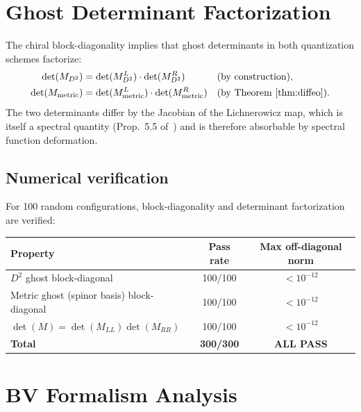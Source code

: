 \documentclass[11pt,a4paper]{article}
\begin{document}
\section{Ghost Determinant Factorization}
\label{sec:det}

The chiral block-diagonality implies that ghost determinants in
both quantization schemes factorize:
\begin{align}
  \det(M_{D^2}) &= \det(M_{D^2}^L) \cdot \det(M_{D^2}^R)
  & &\text{(by construction),} \\
  \det(M_{\mathrm{metric}}) &= \det(M_{\mathrm{metric}}^L)
  \cdot \det(M_{\mathrm{metric}}^R)
  & &\text{(by Theorem~\ref{thm:diffeo}).}
\end{align}
The two determinants differ by the Jacobian of the Lichnerowicz map,
which is itself a spectral quantity (Prop.~5.5 of~\cite{SCTchiralQ})
and is therefore absorbable by spectral function deformation.

\subsection{Numerical verification}

For 100 random configurations, block-diagonality and determinant
factorization are verified:

\begin{center}
\begin{tabular}{lcc}
\toprule
Property & Pass rate & Max off-diagonal norm \\
\midrule
$D^2$ ghost block-diagonal & 100/100 & $< 10^{-12}$ \\
Metric ghost (spinor basis) block-diagonal & 100/100 & $< 10^{-12}$ \\
$\det(M) = \det(M_{LL})\det(M_{RR})$ & 100/100 & $< 10^{-12}$ \\
\midrule
\textbf{Total} & \textbf{300/300} & \textcolor{proven}{\textbf{ALL PASS}} \\
\bottomrule
\end{tabular}
\end{center}

\section{BV Formalism Analysis}
\label{sec:bv}
\end{document}
